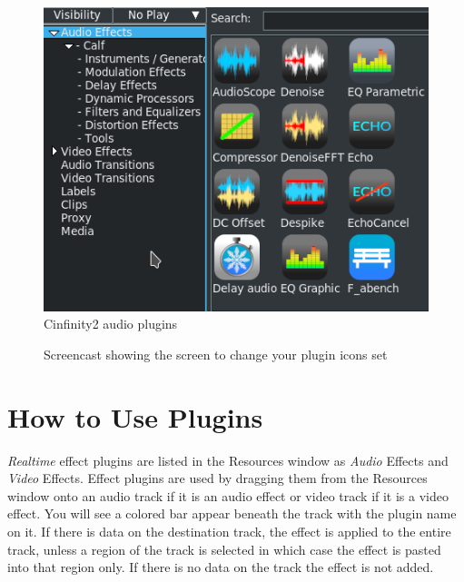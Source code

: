 \begin{figure}[htpb]
    \centering
    \includegraphics[width=0.6\linewidth]{images/audio-plugins.png}
    \caption{Cinfinity2 audio plugins}
    \label{fig:audio-plugins}
\end{figure}

\begin{figure}[htpb]
    \centering    
    \caption{Screencast showing the screen to change your plugin icons set}
    \label{fig:plugin-icons}
\end{figure}

\section{How to Use Plugins}%
\label{sec:how_use_plugins}

\textit{Realtime} effect plugins are listed in the Resources window as \textit{Audio} Effects and \textit{Video} Effects. Effect plugins are used by dragging them from the Resources window onto an audio track if it is an audio effect or video track if it is a video effect. You will see a colored bar appear beneath the track with the plugin name on it. If there is data on the destination track, the effect is applied to the entire track, unless a region of the track is selected in which case the effect is pasted into that region only. If there is no data on the track the effect is not added.

